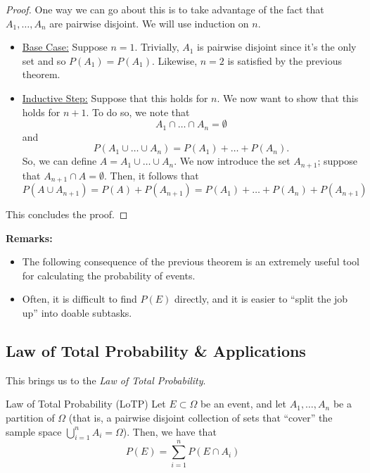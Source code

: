 \documentclass[letterpaper]{article}
\begin{document}
\begin{mdframed}[]
    \begin{proof}
        One way we can go about this is to take advantage of the fact that $A_1, \dots, A_n$ are pairwise disjoint. We will use induction on $n$. 
        \begin{itemize}
            \item \underline{Base Case:} Suppose $n = 1$. Trivially, $A_1$ is pairwise disjoint since it's the only set and so $P(A_1) = P(A_1)$. Likewise, $n = 2$ is satisfied by the previous theorem.
            
            \item \underline{Inductive Step:} Suppose that this holds for $n$. We now want to show that this holds for $n + 1$. To do so, we note that 
            \[A_1 \cap \dots \cap A_n = \emptyset\]
            and 
            \[P(A_1 \cup \dots \cup A_n) = P(A_1) + \dots + P(A_n).\]
            So, we can define $A = A_1 \cup \dots \cup A_n$. We now introduce the set $A_{n + 1}$; suppose that $A_{n + 1} \cap A = \emptyset$. Then, it follows that 
            \[P(A \cup A_{n + 1}) = P(A) + P(A_{n + 1}) = P(A_1) + \dots + P(A_n) + P(A_{n + 1})\]
        \end{itemize}
        This concludes the proof.
    \end{proof}
\end{mdframed}
\textbf{Remarks:}
\begin{itemize}
    \item The following consequence of the previous theorem is an extremely useful tool for calculating the probability of events. 
    \item Often, it is difficult to find $P(E)$ directly, and it is easier to ``split the job up'' into doable subtasks. 
\end{itemize}

\subsection{Law of Total Probability \& Applications}
This brings us to the \emph{Law of Total Probability}. 
\begin{theorem}{Law of Total Probability (LoTP)}{}
    Let $E \subset \Omega$ be an event, and let $A_1, \dots, A_n$ be a partition of $\Omega$ (that is, a pairwise disjoint collection of sets that ``cover'' the sample space $\bigcup_{i = 1}^n A_i = \Omega$). Then, we have that 
    \[P(E) = \sum_{i = 1}^{n} P(E \cap A_i)\]
\end{theorem}
\end{document}
